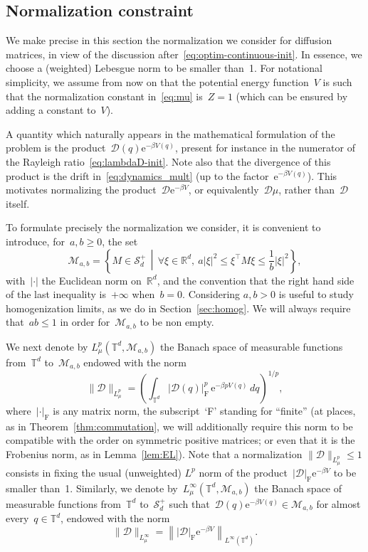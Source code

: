 \documentclass{article}
\newcommand{\rme}{\mathrm{e}}
\newcommand{\R}{\mathbb{R}}
\renewcommand{\leq}{\leqslant}
\renewcommand{\geq}{\geqslant}
\def\R{\mathbb{R}}
\def\T{\mathbb{T}}
\newcommand{\Diff}{\mathcal{D}}
\newcommand{\F}{\mathrm{F}}
\newcommand{\normF}[1]{\left| #1 \right|_{\F}}
\renewcommand{\dim}{d}
\begin{document}
\subsection{Normalization constraint} 
\label{subsec:normalization}

We make precise in this section the normalization we consider for diffusion matrices, in view of the discussion after~\eqref{eq:optim-continuous-init}. In essence, we choose a (weighted) Lebesgue norm to be smaller than~1. For notational simplicity, we assume from now on that the potential energy function~$V$ is such that the normalization constant in~\eqref{eq:mu} is~$Z = 1$ (which can be ensured by adding a constant to~$V$). 

A quantity which naturally appears in the mathematical formulation of the problem is the product~$\Diff(q) \rme^{-\beta V(q)}$, present for instance in the numerator of the Rayleigh ratio~\eqref{eq:lambdaD-init}. Note also that the divergence of this product is the drift in~\eqref{eq:dynamics_mult} (up to the factor~$\rme^{-\beta V(q)}$). This motivates normalizing the product~$\Diff \rme^{-\beta V}$, or equivalently~$\Diff \mu$, rather than~$\Diff$ itself.

To formulate precisely the normalization we consider, it is convenient to introduce, for~$a,b \geq 0$, the set 
\begin{equation}
  \label{eq:Mset-coercive}
  \mathcal{M}_{a, b} = \left\{ M\in\mathcal{S}_\dim^+ \, \middle| \, \forall \xi \in \R^\dim, \ a|\xi|^2\leq \xi^{\top}M\xi \leq \frac{1}{b} |\xi|^2 \right \},
\end{equation}
with~$|\cdot|$ the Euclidean norm on~$\R^\dim$, and the convention that the right hand side of the last inequality is~$+\infty$ when~$b=0$. Considering $a,b > 0$ is useful to study homogenization limits, as we do in Section~\ref{sec:homog}. We will always require that~$ab \leq 1$ in order for~$\mathcal{M}_{a, b}$ to be non empty.

We next denote by $L^p_\mu(\T^\dim, \mathcal{M}_{a,b})$ the Banach space of measurable functions from~$\T^\dim$ to~$\mathcal{M}_{a,b}$ endowed with the norm
\begin{equation}
  \label{eq:norm_L^p_mu_matrices}
  \| \Diff \|_{L^p_\mu} = \left( \int_{\T^\dim} \normF{\Diff(q)}^p \, \rme^{-\beta p V(q)} \, dq \right)^{1/p}, 
\end{equation}
where~$\normF{\cdot}$ is any matrix norm, the subscript~`F' standing for ``finite'' (at places, as in Theorem~\ref{thm:commutation}, we will additionally require this norm to be compatible with the order on symmetric positive matrices; or even that it is the Frobenius norm, as in Lemma~\ref{lem:EL}). Note that a normalization $\| \Diff \|_{L^p_\mu} \leq 1$ consists in fixing the usual (unweighted) $L^p$ norm of the product~$\normF{\Diff} \rme^{-\beta V}$ to be smaller than~1. Similarly, we denote by~$L_\mu^{\infty}(\T^\dim,\mathcal{M}_{a,b})$ the Banach space of measurable functions from~$\T^\dim$ to~$\mathcal{S}_\dim^+$ such that~$\Diff(q) \rme^{-\beta V(q)} \in \mathcal{M}_{a,b}$ for almost every~$q \in \T^\dim$, endowed with the norm
\[
\| \Diff \|_{L^\infty_\mu} = \left\| \normF{\Diff} \rme^{-\beta V} \right\|_{L^\infty(\T^\dim)}. 
\]
\end{document}
